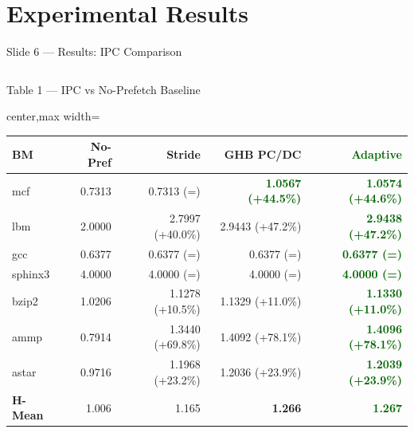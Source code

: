 \documentclass[aspectratio=169,t]{beamer}
\newcommand{\good}[1]{\textcolor{darkgreen}{\textbf{#1}}}
\newcommand{\hl}[1]{\textcolor{iitgold}{\textbf{#1}}}
\begin{document}
\section{Experimental Results}
\begin{frame}{Slide 6 --- Results: IPC Comparison}
\begin{columns}[T,totalwidth=\textwidth]
\begin{block}{Table 1 --- IPC vs No-Prefetch Baseline}
\setlength{\tabcolsep}{2pt}
\tiny
\centering
\begin{adjustbox}{center,max width=\linewidth}
\begin{tabular}{@{}l r r r r@{}}
\toprule
\textbf{BM} & \textbf{No-Pref} & \textbf{Stride} & \textbf{GHB PC/DC} & \textbf{\good{Adaptive}}\\
\midrule
\rowcolor{green!10}
mcf     & 0.7313 & 0.7313 (=)        & \good{1.0567 (+44.5\%)}           & \good{1.0574 (+44.6\%)}\\
\rowcolor{green!10}
lbm     & 2.0000 & 2.7997 (+40.0\%)  & 2.9443 (+47.2\%)               & \good{2.9438 (+47.2\%)}\\
\rowcolor{red!10}
gcc     & 0.6377 & 0.6377 (=)        & 0.6377 (=)                     & \good{0.6377 (=)}\\
\rowcolor{red!10}
sphinx3 & 4.0000 & 4.0000 (=)        & 4.0000 (=)                     & \good{4.0000 (=)}\\
\rowcolor{yellow!10}
bzip2   & 1.0206 & 1.1278 (+10.5\%)  & 1.1329 (+11.0\%)               & \good{1.1330 (+11.0\%)}\\
\rowcolor{yellow!10}
ammp    & 0.7914 & 1.3440 (+69.8\%)  & 1.4092 (+78.1\%)               & \good{1.4096 (+78.1\%)}\\
\rowcolor{yellow!10}
astar   & 0.9716 & 1.1968 (+23.2\%)  & 1.2036 (+23.9\%)               & \good{1.2039 (+23.9\%)}\\
\midrule
\rowcolor{iitblue!10}
\textbf{H-Mean} & 1.006 & 1.165 & \hl{1.266} & \good{\textbf{1.267}}\\
\bottomrule
\end{tabular}
\end{adjustbox}
\end{block}


\end{columns}
\end{frame}
\end{document}
